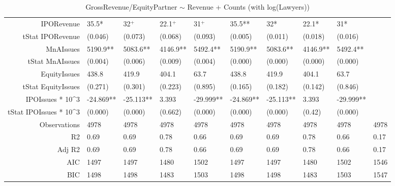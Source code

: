 \begin{table}[ht]
\begin{tabular}{rlllllllll}
  IPORevenue & 35.5* & 32$^{+}$ & 22.1$^{+}$ & 31$^{+}$ & 35.5** & 32* & 22.1* & 31* &  \\ 
  tStat IPORevenue & (0.046) & (0.073) & (0.068) & (0.093) & (0.005) & (0.011) & (0.018) & (0.016) &  \\ 
  MnAIssues & 5190.9** & 5083.6** & 4146.9** & 5492.4** & 5190.9** & 5083.6** & 4146.9** & 5492.4** &  \\ 
  tStat MnAIssues & (0.004) & (0.006) & (0.009) & (0.004) & (0.000) & (0.000) & (0.000) & (0.000) &  \\ 
  EquityIssues & 438.8 & 419.9 & 404.1 & 63.7 & 438.8 & 419.9 & 404.1 & 63.7 &  \\ 
  tStat EquityIssues & (0.271) & (0.301) & (0.223) & (0.895) & (0.165) & (0.182) & (0.142) & (0.846) &  \\ 
  IPOIssues * 10^3 & -24.869** & -25.113** & 3.393 & -29.999** & -24.869** & -25.113** & 3.393 & -29.999** &  \\ 
  tStat IPOIssues * 10^3 & (0.000) & (0.000) & (0.662) & (0.000) & (0.000) & (0.000) & (0.42) & (0.000) &  \\ 
  Observations & 4978 & 4978 & 4978 & 4978 & 4978 & 4978 & 4978 & 4978 & 4978 \\ 
  R2 & 0.69 & 0.69 & 0.78 & 0.66 & 0.69 & 0.69 & 0.78 & 0.66 & 0.17 \\ 
  Adj R2 & 0.69 & 0.69 & 0.78 & 0.66 & 0.69 & 0.69 & 0.78 & 0.66 & 0.17 \\ 
  AIC & 1497 & 1497 & 1480 & 1502 & 1497 & 1497 & 1480 & 1502 & 1546 \\ 
  BIC & 1498 & 1498 & 1483 & 1503 & 1498 & 1498 & 1483 & 1503 & 1547 \\ 
   \hline
\end{tabular}
\caption{GrossRevenue/EquityPartner $\sim$ Revenue + Counts (with log(Lawyers))} 
\end{table}
